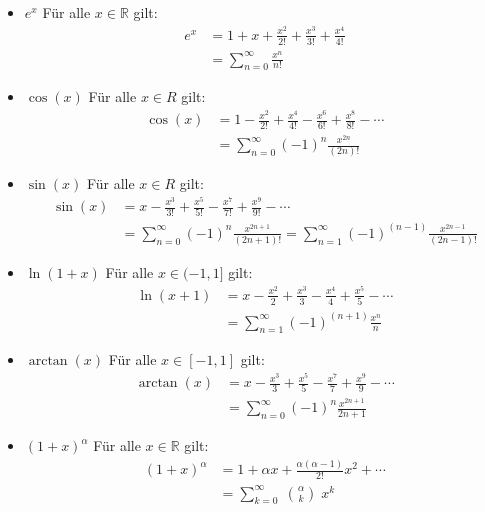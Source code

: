 \documentclass[25pt]{sciposter}
\newcommand{\R}{\mathbb{R}}
\begin{document}
\begin{multicols}{3}
\begin{itemize}
	\item $\boxed{e^x}$ Für alle $x \in \R$ gilt:
	\begin{align*}
		e^x &= 1 + x + \frac{x^2}{2!} + \frac{x^3}{3!} + \frac{x^4}{4!}\\
		&= \sum_{n=0}^{\infty} \frac{x^n}{n!}
	\end{align*}
	
	\item $\boxed{\cos(x)}$ Für alle $x\in R$ gilt:
	\begin{align*}
	\cos(x) &= 1 - \frac{x^2}{2!} + \frac{x^4}{4!} - \frac{x^6}{6!} + \frac{x^8}{8!} - \cdots  \\
	&= \sum_{n=0}^{\infty} (-1)^n \frac{x^{2n}}{(2n)!}
	\end{align*}
	
	\item $\boxed{\sin(x)}$ Für alle $x\in R$ gilt:
	\begin{align*}
	\sin(x) &=  x - \frac{x^3}{3!} + \frac{x^5}{5!} - \frac{x^7}{7!} + \frac{x^9}{9!} - \cdots\\
	&= \sum_{n=0}^{\infty} (-1)^n \frac{x^{2n+1}}{(2n+1)!} = \sum_{n=1}^{\infty} (-1)^{(n-1)} \frac{x^{2n-1}}{(2n-1)!}
	\end{align*}

	\item $\boxed{\ln(1+x)}$ Für alle $x\in (-1,1]$ gilt:
	\begin{align*}
	\ln(x+1) &= x - \frac{x^2}{2} + \frac{x^3}{3} - \frac{x^4}{4} + \frac{x^5}{5}- \cdots \\
	&= \sum_{n=1}^{\infty} (-1)^{(n+1)} \frac{x^n}{n}
	\end{align*}

	\item $\boxed{\arctan(x)}$ Für alle $x\in [-1,1]$ gilt:
	\begin{align*}
	\arctan(x) &= x - \frac{x^3}{3} + \frac{x^5}{5} - \frac{x^7}{7} + \frac{x^9}{9} - \cdots \\
	&= \sum_{n=0}^{\infty} (-1)^n \frac{x^{2n+1}}{2n+1}
	\end{align*}

	\item $\boxed{(1 + x)^\alpha}$ Für alle $x\in \R$ gilt:
	\begin{align*}
	(1 + x)^\alpha &=  1 + \alpha x + \frac{\alpha(\alpha-1)}{2!} x^2 + \cdots \\
	 &= \sum_{k=0}^{\infty} \; {\alpha \choose k} \; x^k 
	\end{align*}
	


\end{itemize}
\end{multicols}
\end{document}
